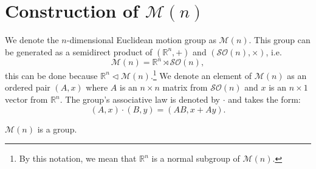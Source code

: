 \documentclass{article}
\begin{document}
\section{Construction of $\mathcal{M}(n)$} 
\begin{define}
    We denote the $n$-dimensional Euclidean motion group as $\mathcal{M}(n)$. This group can be generated as a semidirect product of $(\mathbb{R}^{n},+)$ and $(\mathcal{SO}(n), \times)$, i.e. 
    \[
        \mathcal{M}(n) = \mathbb{R}^{n} \rtimes \mathcal{SO}(n), 
    \]
    this can be done because $\mathbb{R}^{n} \triangleleft \mathcal{M}(n)$.\footnote{By this notation, we mean that $\mathbb{R}^{n}$ is a normal subgroup of $\mathcal{M}(n)$.} We denote an element of $\mathcal{M}(n)$ as an ordered pair $(A, x)$ where $A$ is an $n \times n$ matrix from $\mathcal{SO}(n)$ and $x$ is an $n \times 1$ vector from $\mathbb{R}^{n}$. The group's associative law is denoted by $\cdot$ and takes the form: \[ (A,x)\cdot (B,y) = (AB, x+Ay) .\]
\end{define}
\begin{theorem}
    $\mathcal{M}(n)$ is a group. 
\end{theorem}
\end{document}
